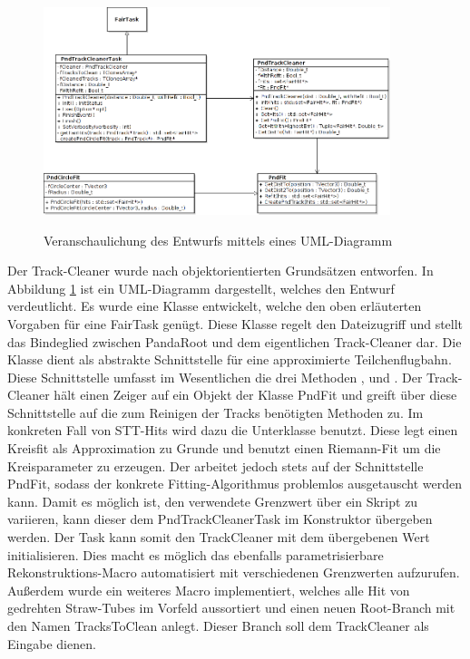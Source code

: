 \begin{figure}
  \includegraphics[width=0.9\textwidth]{Bilder/CleanerUML}
	\label{fig:CleanerUML}
	\caption{Veranschaulichung des Entwurfs mittels eines UML-Diagramm}
	
\end{figure}
Der Track-Cleaner wurde nach objektorientierten Grundsätzen entworfen. In Abbildung \ref{fig:CleanerUML} ist ein UML-Diagramm dargestellt, welches den Entwurf verdeutlicht. Es wurde eine Klasse  entwickelt, welche den oben erläuterten Vorgaben für eine FairTask genügt. Diese Klasse regelt den Dateizugriff und stellt das Bindeglied zwischen PandaRoot und dem eigentlichen Track-Cleaner dar. Die Klasse  dient als abstrakte Schnittstelle für eine approximierte Teilchenflugbahn. Diese Schnittstelle umfasst im Wesentlichen die drei Methoden ,  und . Der Track-Cleaner hält einen Zeiger auf ein Objekt der Klasse PndFit und greift über diese Schnittstelle auf die zum Reinigen der Tracks benötigten Methoden zu. Im konkreten Fall von STT-Hits wird dazu die Unterklasse  benutzt. Diese legt einen Kreisfit als Approximation zu Grunde und benutzt einen Riemann-Fit um die Kreisparameter zu erzeugen. Der  arbeitet jedoch stets auf der Schnittstelle PndFit, sodass der konkrete Fitting-Algorithmus problemlos ausgetauscht werden kann. Damit es möglich ist, den verwendete Grenzwert  über ein Skript zu variieren, kann dieser dem PndTrackCleanerTask im Konstruktor übergeben werden. Der Task kann somit den TrackCleaner mit dem übergebenen Wert initialisieren. Dies macht es möglich das ebenfalls parametrisierbare Rekonstruktions-Macro automatisiert mit verschiedenen Grenzwerten aufzurufen. Außerdem wurde ein weiteres Macro implementiert, welches alle Hit von gedrehten Straw-Tubes im Vorfeld aussortiert und einen neuen Root-Branch mit den Namen TracksToClean anlegt. Dieser Branch soll dem TrackCleaner als Eingabe dienen.

